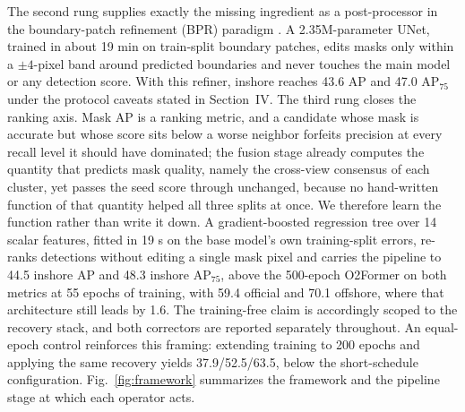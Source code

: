 The second rung supplies exactly the missing ingredient as a post-processor in the boundary-patch refinement (BPR) paradigm \cite{bpr2021}. A 2.35M-parameter UNet, trained in about 19 min on train-split boundary patches, edits masks only within a $\pm 4$-pixel band around predicted boundaries and never touches the main model or any detection score. With this refiner, inshore reaches 43.6 AP and 47.0 AP$_{75}$ under the protocol caveats stated in Section~IV. The third rung closes the ranking axis. Mask AP is a ranking metric, and a candidate whose mask is accurate but whose score sits below a worse neighbor forfeits precision at every recall level it should have dominated; the fusion stage already computes the quantity that predicts mask quality, namely the cross-view consensus of each cluster, yet passes the seed score through unchanged, because no hand-written function of that quantity helped all three splits at once. We therefore learn the function rather than write it down. A gradient-boosted regression tree over 14 scalar features, fitted in 19 s on the base model's own training-split errors, re-ranks detections without editing a single mask pixel and carries the pipeline to 44.5 inshore AP and 48.3 inshore AP$_{75}$, above the 500-epoch O2Former on both metrics at 55 epochs of training, with 59.4 official and 70.1 offshore, where that architecture still leads by 1.6. The training-free claim is accordingly scoped to the recovery stack, and both correctors are reported separately throughout. An equal-epoch control reinforces this framing: extending training to 200 epochs and applying the same recovery yields 37.9/52.5/63.5, below the short-schedule configuration. Fig.~\ref{fig:framework} summarizes the framework and the pipeline stage at which each operator acts.

